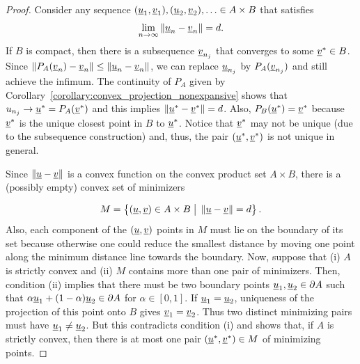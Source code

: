 \begin{proof}
Consider any sequence $(\underline u_{1},\underline v_{1}),(\underline u_{2},\underline v_{2}),\ldots\in A\times B$ that satisfies
\[
\lim_{n\rightarrow\infty}\left\Vert \underline u_{n}-\underline v_{n}\right\Vert =d.
\]
If $B$ is compact, then there is a subsequence $\underline v_{n_{j}}$ that converges to some $\underline v^{*}\in B$.
Since $\| P_A (\underline{v}_n)-\underline v_{n} \| \leq \|\underline u_{n}-\underline v_{n}\| $, we can replace $\underline u_{n_{j}}$ by $P_A (\underline{v}_{n_j})$ and still achieve the infimum.
The continuity of $P_A$ given by Corollary~\ref{corollary:convex_projection_nonexpansive} shows that $u_{n_{j}} \to \underline{u}^* = P_A (\underline{v}^*)$ and this implies $\| \underline{u}^* - \underline{v}^* \| = d$.
Also, $P_B (\underline{u}^*) = \underline{v}^*$ because $\underline{v}^*$ is the unique closest point in $B$ to $\underline{u}^*$.
Notice that $\underline v^{*}$ may not be unique (due to the subsequence construction) and, thus, the pair $(\underline{u}^*,\underline{v}^*)$ is not unique in general.

Since $\left\Vert \underline u-\underline v\right\Vert $ is a convex function on the convex product set $A\times B$, there is a (possibly empty) convex set of minimizers

\[
M=\left\{ (\underline u,\underline v)\in A\times B\;\big|\;\left\Vert \underline u-\underline v\right\Vert =d\right\} .
\]
Also, each component of the $(\underline{u},\underline{v})$ points in $M$ must lie on the boundary of its set because otherwise one could reduce the smallest distance by moving one point along the minimum distance line towards the boundary.
Now, suppose that (i) $A$ is strictly convex and (ii) $M$ contains more than one pair of minimizers.
Then, condition (ii) implies that there must be two boundary points $\underline u_{1},\underline u_{2}\in\partial A$ such that $\alpha\underline u_{1}+(1-\alpha)\underline u_{2}\in\partial A$ for $\alpha\in[0,1]$.
If $\underline{u}_1=\underline{u}_2$, uniqueness of the projection of this point onto $B$ gives $\underline{v}_1=\underline{v}_2$.
Thus two distinct minimizing pairs must have $\underline{u}_1\ne\underline{u}_2$.
But this contradicts condition (i) and shows that, if $A$ is strictly convex, then there is at most one pair $(\underline u^{*},\underline v^{*})\in M$ of minimizing points.
\end{proof}

